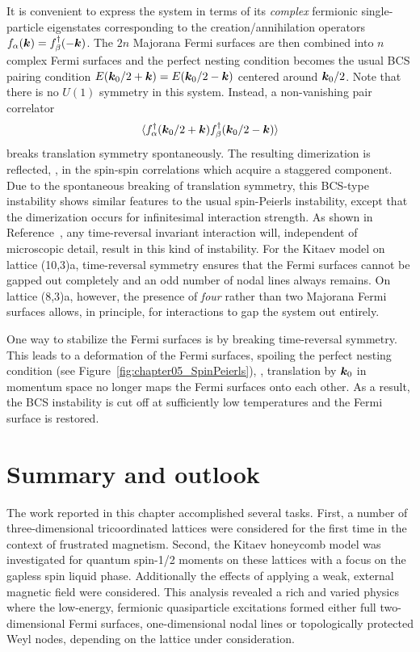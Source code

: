 It is convenient to express the system in terms of its \textit{complex} fermionic single-particle eigenstates corresponding to the creation/annihilation operators $f_{\alpha}(\bm{k}) = f^{\dagger}_{\beta}(-\bm{k})$.
The $2n$ Majorana Fermi surfaces are then combined into $n$ complex Fermi surfaces and the perfect nesting condition becomes the usual BCS pairing condition $E(\bm{k}_0/2 + \bm{k}) = E(\bm{k}_0/2 - \bm{k})$ centered around $\bm{k}_0/2$.
Note that there is no $U(1)$ symmetry in this system.
Instead, a non-vanishing pair correlator
%
\begin{equation}
	\langle f^{\dagger}_{\alpha}(\bm{k}_0/2 + \bm{k}) f^{\dagger}_{\beta}(\bm{k}_0/2 - \bm{k}) \rangle
\end{equation}
%
breaks translation symmetry spontaneously.
The resulting dimerization is reflected, \eg, in the spin-spin correlations which acquire a staggered component.
Due to the spontaneous breaking of translation symmetry, this BCS-type instability shows similar features to the usual spin-Peierls instability, except that the dimerization occurs for infinitesimal interaction strength.
As shown in Reference~\cite{HermannsPRL2015b}, any time-reversal invariant interaction will, independent of microscopic detail, result in this kind of instability.
For the Kitaev model on lattice (10,3)a, time-reversal symmetry ensures that the Fermi surfaces cannot be gapped out completely and an odd number of nodal lines always remains.
On lattice (8,3)a, however, the presence of \textit{four} rather than two Majorana Fermi surfaces allows, in principle, for interactions to gap the system out entirely.

One way to stabilize the Fermi surfaces is by breaking time-reversal symmetry.
This leads to a deformation of the Fermi surfaces, spoiling the perfect nesting condition (see Figure~\ref{fig:chapter05_SpinPeierls}), \ie, translation by $\bm{k}_0$ in momentum space no longer maps the Fermi surfaces onto each other.
As a result, the BCS instability is cut off at sufficiently low temperatures and the Fermi surface is restored.


%
%
\section{Summary and outlook}
\label{section:chapter05_Conclusion}
%
%
The work reported in this chapter accomplished several tasks.
First, a number of three-dimensional tricoordinated lattices were considered for the first time in the context of frustrated magnetism.
Second, the Kitaev honeycomb model was investigated for quantum spin-1/2 moments on these lattices with a focus on the gapless spin liquid phase.
Additionally the effects of applying a weak, external magnetic field were considered.
This analysis revealed a rich and varied physics where the low-energy, fermionic quasiparticle excitations formed either full two-dimensional Fermi surfaces, one-dimensional nodal lines or topologically protected Weyl nodes, depending on the lattice under consideration.

